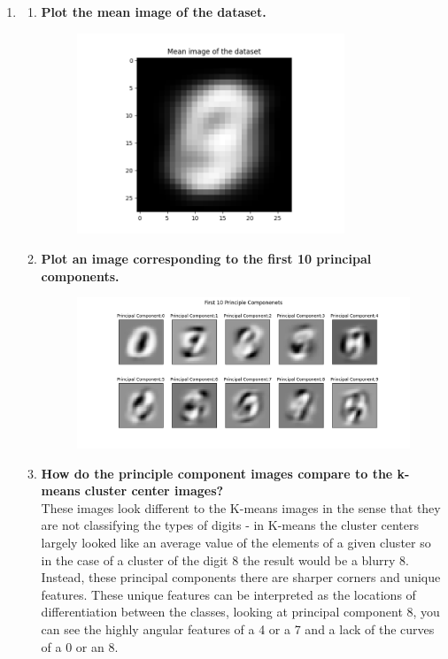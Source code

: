 \documentclass[submit]{harvardml}
\begin{document}
\begin{enumerate}
    \item 
    \begin{enumerate}
        \item \textbf{Plot the mean image of the dataset.}
        \begin{figure}[H]
            \includegraphics[width=8cm]{hw5/plots/2_2a.png}
            \centering
        \end{figure}
        \item \textbf{Plot an image corresponding to the first 10 principal components.}
        \begin{figure}[H]
            \includegraphics[width=18cm]{hw5/plots/2_2b.png}
            \centering
        \end{figure}
        \item \textbf{How do the principle component images compare to the k-means cluster center images?}\\
        These images look different to the K-means images in the sense that they are not classifying the types of digits - in K-means the cluster centers largely looked like an average value of the elements of a given cluster so in the case of a cluster of the digit $8$ the result would be a blurry $8$. Instead, these principal components there are sharper corners and unique features. These unique features can be interpreted as the locations of differentiation between the classes, looking at principal component 8, you can see the highly angular features of a 4 or a 7 and a lack of the curves of a 0 or an 8.
    \end{enumerate}
    

\end{enumerate}
\end{document}

